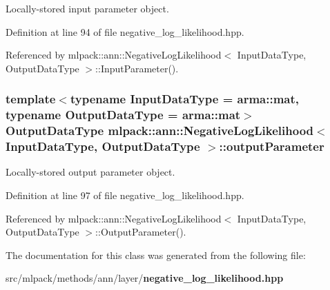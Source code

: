 Locally-\/stored input parameter object. 



Definition at line 94 of file negative\+\_\+log\+\_\+likelihood.\+hpp.



Referenced by mlpack\+::ann\+::\+Negative\+Log\+Likelihood$<$ Input\+Data\+Type, Output\+Data\+Type $>$\+::\+Input\+Parameter().

\subsubsection[{output\+Parameter}]{\setlength{\rightskip}{0pt plus 5cm}template$<$typename Input\+Data\+Type  = arma\+::mat, typename Output\+Data\+Type  = arma\+::mat$>$ Output\+Data\+Type {\bf mlpack\+::ann\+::\+Negative\+Log\+Likelihood}$<$ Input\+Data\+Type, Output\+Data\+Type $>$\+::output\+Parameter\hspace{0.3cm}{\ttfamily [private]}}\label{classmlpack_1_1ann_1_1NegativeLogLikelihood_a1521506385588423285aa23925b4948d}


Locally-\/stored output parameter object. 



Definition at line 97 of file negative\+\_\+log\+\_\+likelihood.\+hpp.



Referenced by mlpack\+::ann\+::\+Negative\+Log\+Likelihood$<$ Input\+Data\+Type, Output\+Data\+Type $>$\+::\+Output\+Parameter().



The documentation for this class was generated from the following file\+:\begin{DoxyCompactItemize}
\item 
src/mlpack/methods/ann/layer/{\bf negative\+\_\+log\+\_\+likelihood.\+hpp}\end{DoxyCompactItemize}

